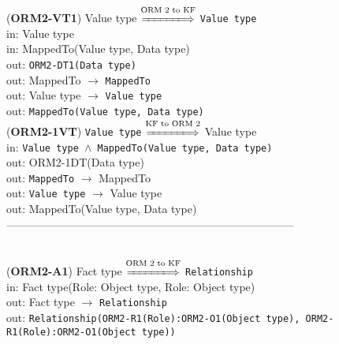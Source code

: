 \documentclass[sn-mathphys]{sn-jnl}
\begin{document}
{{{{({\bf ORM2-VT1}) {Value type} $\overset{\text{ORM 2 to KF}}{\xLongrightarrow{\hspace*{1.4cm}}}$ {\tt Value type}\\
\hspace*{0.3cm}in: Value type\\
\hspace*{0.3cm}in: MappedTo(Value type, Data type)\\
\hspace*{0.5cm}out:  {\tt ORM2-DT1(Data type)} \\
\hspace*{0.5cm}out:  MappedTo $\rightarrow$ {\tt MappedTo}\\
\hspace*{0.5cm}out:  Value type $\rightarrow$ {\tt Value type}\\
\hspace*{0.5cm}out:  {\tt MappedTo(Value type, Data type)}\\

({\bf ORM2-1VT}) {\tt Value type} $\overset{\text{KF to ORM 2}}{\xLongrightarrow{\hspace*{1.4cm}}}$ {Value type}\\
\hspace*{0.3cm}in: {\tt Value type $\wedge$ MappedTo(Value type, Data type)}\\
\hspace*{0.5cm}out:  {ORM2-1DT(Data type)} \\
\hspace*{0.5cm}out:  {\tt MappedTo} $\rightarrow$ {MappedTo}\\
\hspace*{0.5cm}out:  {\tt Value type} $\rightarrow$ {Value type}\\
\hspace*{0.5cm}out:  MappedTo(Value type, Data type)\\

------------------------------------------------------------------------------
\\ \

({\bf ORM2-A1}) {Fact type} $\overset{\text{ORM 2 to KF}}{\xLongrightarrow{\hspace*{1.4cm}}}$ {\tt Relationship}\\
\hspace*{0.3cm}in: {Fact type(Role: Object type, Role: Object type)} \\
\hspace*{0.5cm}out:  {Fact type} $\rightarrow$ {\tt Relationship}\\
\hspace*{0.5cm}out:  {\tt Relationship(ORM2-R1(Role):ORM2-O1(Object type), ORM2-R1(Role):ORM2-O1(Object type))}\\

}}}}
\end{document}
